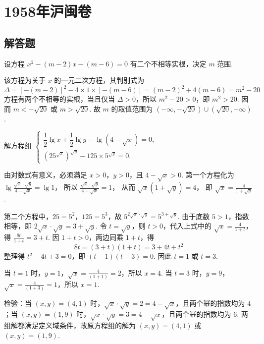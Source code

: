 \chapter{1958年沪闽卷}

\section{解答题}

\begin{problem}
设方程 \(x^{2}-(m-2)x-(m-6)=0\) 有二个不相等实根，决定 \(m\) 范围.
\end{problem}

\begin{solution}
该方程为关于 \(x\) 的一元二次方程，其判别式为
\[
\Delta=\left[-(m-2)\right]^{2}-4\times 1\times\left[-(m-6)\right]
=(m-2)^{2}+4(m-6)=m^{2}-20
\]
方程有两个不相等的实根，当且仅当 \(\Delta>0\)，所以 \(m^{2}-20>0\)，即 \(m^{2}>20\). 因而 \(m<-\sqrt{20}\) 或 \(m>\sqrt{20}\). 故 \(m\) 的取值范围为 \(\left(-\infty,-\sqrt{20}\right)\cup\left(\sqrt{20},+\infty\right)\).
\end{solution}

\begin{problem}
解方程组
\(
\begin{cases}
\dfrac{1}{2}\lg x+\dfrac{1}{2}\lg y-\lg\left(4-\sqrt{x}\right)=0,\\
\left(25^{\sqrt{x}}\right)^{\sqrt{y}}-125\times 5^{\sqrt{y}}=0.
\end{cases}
\)
\end{problem}

\begin{solution}
由对数式有意义，必须满足 \(x>0\)，\(y>0\)，且 \(4-\sqrt{x}>0\). 第一个方程化为
\(\lg\frac{\sqrt{x}\cdot\sqrt{y}}{4-\sqrt{x}}=\lg 1\)，
所以
\(\frac{\sqrt{x}\cdot\sqrt{y}}{4-\sqrt{x}}=1\)，
从而
\(\sqrt{x}\left(1+\sqrt{y}\right)=4\)，
即
\(\sqrt{x}=\frac{4}{1+\sqrt{y}}\).

第二个方程中，\(25=5^{2}\)，\(125=5^{3}\)，故
\(5^{2\sqrt{x}\cdot\sqrt{y}}=5^{3+\sqrt{y}}\).
由于底数 \(5>1\)，指数相等，即
\(2\sqrt{x}\cdot\sqrt{y}=3+\sqrt{y}\).
令 \(t=\sqrt{y}\)，则 \(t>0\)，代入上式中的 \(\sqrt{x}=\frac{4}{1+t}\)，得
\(\frac{8t}{1+t}=3+t\).
因 \(1+t>0\)，两边同乘 \(1+t\)，得
\[
8t=(3+t)(1+t)=3+4t+t^{2}
\]
整理得 \(t^{2}-4t+3=0\)，即 \((t-1)(t-3)=0\). 因此 \(t=1\) 或 \(t=3\).

当 \(t=1\) 时，\(y=1\)，\(\sqrt{x}=\frac{4}{(1+1)}=2\)，所以 \(x=4\). 当 \(t=3\) 时，\(y=9\)，\(\sqrt{x}=\frac{4}{(1+3)}=1\)，所以 \(x=1\).

检验：当 \((x,y)=(4,1)\) 时，\(\sqrt{x}\cdot\sqrt{y}=2=4-\sqrt{x}\)，且两个幂的指数均为 \(4\)；当 \((x,y)=(1,9)\) 时，\(\sqrt{x}\cdot\sqrt{y}=3=4-\sqrt{x}\)，且两个幂的指数均为 \(6\). 两组解都满足定义域条件，故原方程组的解为
\(\left(x,y\right)=\left(4,1\right)\) 或 \(\left(x,y\right)=\left(1,9\right)\).
\end{solution}

